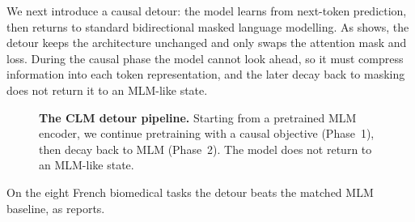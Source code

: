 We next introduce a causal detour: the model learns from next-token prediction,
then returns to standard bidirectional masked language modelling. As
 shows, the detour keeps the architecture unchanged and only
swaps the attention mask and loss. During the causal phase the model cannot look
ahead, so it must compress information into each token representation, and the later
decay back to masking does not return it to an MLM-like state.

\begin{figure}[ht]
\centering
{}
\caption{\textbf{The CLM detour pipeline.} Starting from a pretrained MLM encoder, we continue pretraining with a causal objective (Phase~1), then decay back to MLM (Phase~2). The model does not return to an MLM-like state.}
\label{fig:clm-pipeline}
\end{figure}

On the eight French biomedical tasks the detour beats the matched MLM baseline, as
 reports.

